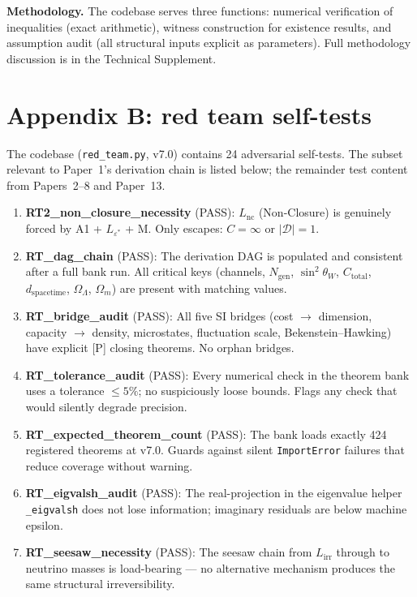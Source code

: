 \documentclass[11pt]{article}
\theoremstyle{remark}
\begin{document}
\smallskip\noindent\textbf{Methodology.}  The codebase serves three functions: numerical verification of inequalities (exact arithmetic), witness construction for existence results, and assumption audit (all structural inputs explicit as parameters).  Full methodology discussion is in the Technical Supplement.


\section{Appendix B: red team self-tests}

The codebase (\texttt{red\_team.py}, v7.0) contains 24 adversarial self-tests.  The subset relevant to Paper~1's derivation chain is listed below; the remainder test content from Papers~2--8 and Paper~13.

\begin{enumerate}
  \item \textbf{RT2\_non\_closure\_necessity} (PASS):  $L_{\mathrm{nc}}$ (Non-Closure) is genuinely forced by A1 + $L_{\varepsilon^*}$ + M.  Only escapes: $C = \infty$ or $|\mathcal{D}| = 1$.

  \item \textbf{RT\_dag\_chain} (PASS):  The derivation DAG is populated and consistent after a full bank run.  All critical keys (channels, $N_{\mathrm{gen}}$, $\sin^2\theta_W$, $C_{\mathrm{total}}$, $d_{\mathrm{spacetime}}$, $\Omega_\Lambda$, $\Omega_m$) are present with matching values.

  \item \textbf{RT\_bridge\_audit} (PASS):  All five SI bridges (cost $\to$ dimension, capacity $\to$ density, microstates, fluctuation scale, Bekenstein--Hawking) have explicit [P] closing theorems.  No orphan bridges.

  \item \textbf{RT\_tolerance\_audit} (PASS):  Every numerical check in the theorem bank uses a tolerance $\le 5\%$; no suspiciously loose bounds.  Flags any check that would silently degrade precision.

  \item \textbf{RT\_expected\_theorem\_count} (PASS): The bank loads exactly 424 registered theorems at v7.0. Guards against silent \texttt{ImportError} failures that reduce coverage without warning.

  \item \textbf{RT\_eigvalsh\_audit} (PASS):  The real-projection in the eigenvalue helper \texttt{\_eigvalsh} does not lose information; imaginary residuals are below machine epsilon.

  \item \textbf{RT\_seesaw\_necessity} (PASS):  The seesaw chain from $L_{\mathrm{irr}}$ through to neutrino masses is load-bearing --- no alternative mechanism produces the same structural irreversibility.
\end{enumerate}
\end{document}
